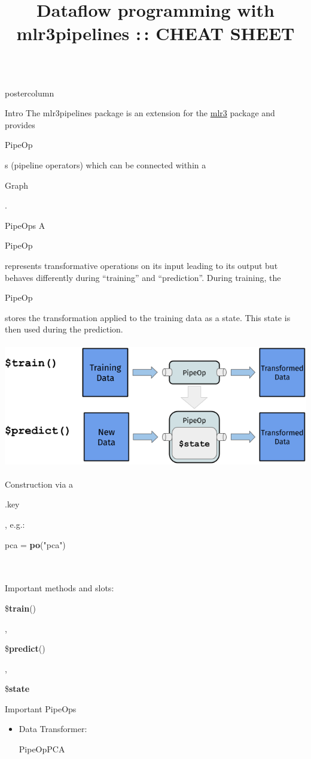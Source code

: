 \documentclass{beamer}
\title{Dataflow programming with mlr3pipelines :\,: CHEAT SHEET} %
\newlength{\columnheight} %
\newcommand{\codeinline}[1]{\begin{codeboxinline}#1\end{codeboxinline}}
\begin{document}
\begin{frame}[fragile]{}
	\begin{columns}
		\begin{column}{.245\textwidth}
			\begin{beamercolorbox}[center]{postercolumn}
				\begin{minipage}{.98\textwidth}
					\parbox[t][\columnheight]{\textwidth}{
						\begin{myblock}{Intro}
              The mlr3pipelines package is an extension for the \href{https://github.com/mlr-org/mlr3}{mlr3} package and provides \codeinline{PipeOp}s (pipeline operators) which can be connected within a \codeinline{Graph}.
            \end{myblock}
						\begin{myblock}{PipeOps}
              A \codeinline{PipeOp} represents transformative operations on its input leading to its output but behaves differently during ``training'' and ``prediction''. During training, the \codeinline{PipeOp} stores the transformation applied to the training data as a state. This state is then used during the prediction.\\
              \ \\
              \includegraphics[width=\textwidth]{img/po.png}
              \ \\
              Construction via a \codeinline{.key}, e.g.: \codeinline{pca = \textbf{po}("pca")}\\
              \ \\
              Important methods and slots:\\
              \codeinline{\$\textbf{train}()}, \codeinline{\$\textbf{predict}()}, \codeinline{\$\textbf{state}}
						\end{myblock}
            \begin{myblock}{Important PipeOps}
              \begin{itemize}
                \item Data Transformer: \codeinline{PipeOpPCA}

\end{itemize}
\end{myblock}}
\end{minipage}
\end{beamercolorbox}
\end{column}
\end{columns}
\end{frame}
\end{document}
